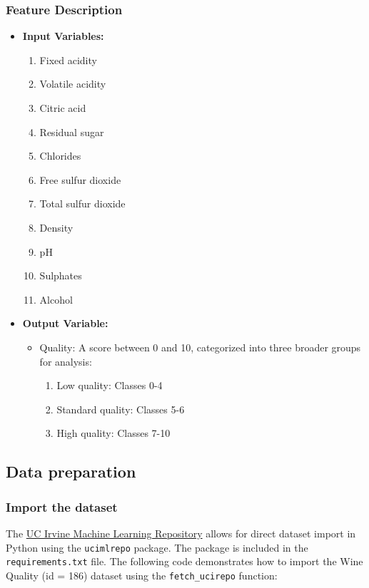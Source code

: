 \subsubsection*{Feature Description}
\begin{itemize}
    \item \textbf{Input Variables:}
    \begin{enumerate}
        \item Fixed acidity
        \item Volatile acidity
        \item Citric acid
        \item Residual sugar
        \item Chlorides
        \item Free sulfur dioxide
        \item Total sulfur dioxide
        \item Density
        \item pH
        \item Sulphates
        \item Alcohol
    \end{enumerate}
    \item \textbf{Output Variable:}
    \begin{itemize}
        \item Quality: A score between 0 and 10, categorized into three broader groups for analysis:
        \begin{enumerate}
            \item Low quality: Classes 0-4
            \item Standard quality: Classes 5-6
            \item High quality: Classes 7-10
        \end{enumerate}
    \end{itemize}
\end{itemize}

\subsection{Data preparation}

\subsubsection{Import the dataset}

The \href{https://archive.ics.uci.edu/}{UC Irvine Machine Learning Repository} allows for direct dataset import in Python using the \texttt{ucimlrepo} package. The package is included in the \texttt{requirements.txt} file. The following code demonstrates how to import the Wine Quality (id = 186) dataset using the \texttt{fetch\_ucirepo} function:

